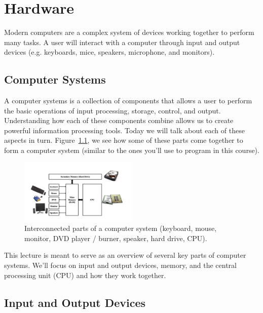 \chapter{Hardware}

Modern computers are a complex system of devices working together
to perform many tasks. A user will interact with a computer through
input and output devices (e.g. keyboards, mice, speakers, microphone,
and monitors).

\section{Computer Systems}

A computer systems is a collection of components that allows a user
to perform the basic operations of input processing, storage, control,
and output. Understanding how each of these components combine allows
us to create powerful information processing tools. Today we will talk
about each of these aspects in turn. Figure~\ref{fig:hardware:overview},
we see how some of these parts come together to form a computer system
(similar to the ones you'll use to program in this course).

\begin{figure}
	\centering
	\includegraphics[width=0.5\textwidth]{images/cs_intro_hardware_overview.png}
	\caption{Interconnected parts of a computer system (keyboard, mouse,
                 monitor, DVD player / burner, speaker, hard drive, CPU).}
	\label{fig:hardware:overview}
\end{figure}

This lecture is meant to serve as an overview of several key parts of
computer systems. We'll focus on input and output devices, memory, and
the central processing unit (CPU) and how they work together.

\section{Input and Output Devices}

